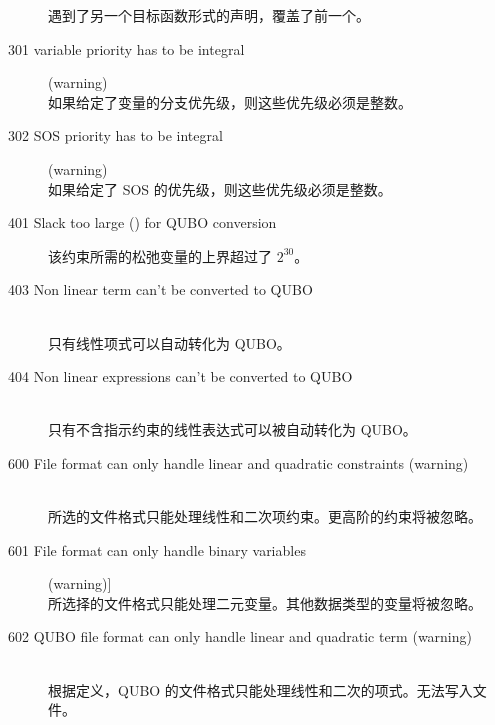 \begin{description}
  遇到了另一个目标函数形式的声明，覆盖了前一个。
%
%
\item[301 variable priority has to be integral] (warning)\ \\
  如果给定了变量的分支优先级，则这些优先级必须是整数。
\item[302 SOS priority has to be integral] (warning)\ \\
  如果给定了 SOS 的优先级，则这些优先级必须是整数。
\item [401 Slack too large (\code{xxx}) for QUBO conversion]
  该约束所需的松弛变量的上界超过了 $2^{30}$。
\item [403 Non linear term can't be converted to QUBO]\ \\
  只有线性项式可以自动转化为 QUBO。
\item [404 Non linear expressions can't be converted to QUBO]\ \\
  只有不含指示约束的线性表达式可以被自动转化为 QUBO。
\item[600 File format can only handle linear and quadratic constraints
         (warning)]\ \\
  所选的文件格式只能处理线性和二次项约束。更高阶的约束将被忽略。
\item[601 File format can only handle binary variables] (warning)]\ \\
  所选择的文件格式只能处理二元变量。其他数据类型的变量将被忽略。
\item[602 QUBO file format can only handle linear and quadratic term
         (warning)]\ \\
  根据定义，QUBO 的文件格式只能处理线性和二次的项式。无法写入文件。

\end{description}
